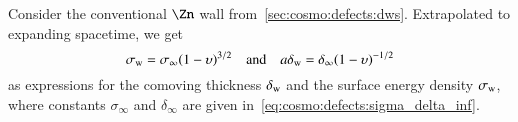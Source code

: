     Consider the conventional $\Zn$ wall from~\cref{sec:cosmo:defects:dws}. Extrapolated to expanding spacetime, we get
    \begin{equation}\label{eq:PT:symm_dws:surface_tension_and_thickness_FLRW}
         \sigma\ped{w} = \sigma_\infty \pclosed{1-\upsilon}^{3/2} %
         \quad \text{and} \quad  %
         a\delta\ped{w} = \delta_\infty \pclosed{1-\upsilon}^{-1/2}
    \end{equation}
    as expressions for the comoving thickness $\delta_\mathrm{w}$ and the surface energy density $\sigma_\mathrm{w}$, where constants $\sigma_\infty$ and $\delta_\infty$ are given in~\cref{eq:cosmo:defects:sigma_delta_inf}.





